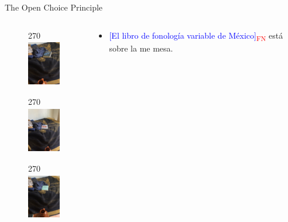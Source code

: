 \documentclass{beamer}
\begin{document}
\begin{frame}{The Open Choice Principle}
	\begin{columns}
    	\begin{column}{6cm}
        	\begin{figure}
            	\begin{turn}{270}
                \includegraphics[height=2.0cm, width=1.6cm]{pbm.JPG}
                \end{turn}
            \end{figure}
            \begin{figure}
            	\begin{turn}{270}
    			\includegraphics[height=2.0cm, width=1.6cm]{hayes.JPG}
                \end{turn}
            \end{figure}
            \begin{figure}
            	\begin{turn}{270}
    			\includegraphics[height=2.0cm, width=1.6cm]{sonoro.JPG}
                \end{turn}
            \end{figure}
        \end{column}
        \begin{column}{6cm}
        \begin{itemize}
        \vspace{2em}
        \item \textcolor{blue}{{[El libro de fonología variable de México]}}\textcolor{red}{\textsubscript{FN}} está sobre la me mesa.
        \begin{itemize}

\end{itemize}
\end{itemize}
\end{column}
\end{columns}
\end{frame}
\end{document}
